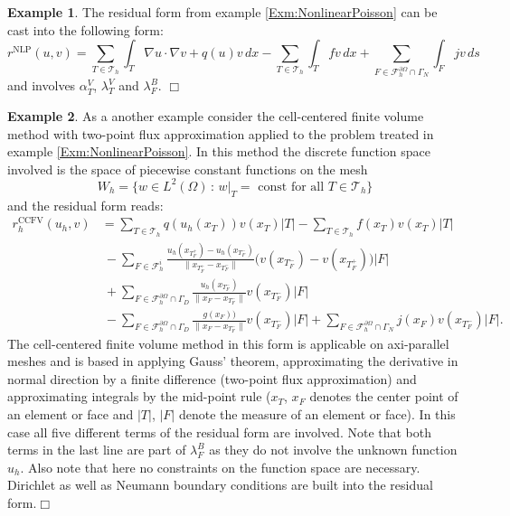 \documentclass[a4paper,12pt]{article}
\theoremstyle{definition}
\newtheorem{exm}{Example}
\begin{document}
\begin{exm} \label{Exm:NonlinearPoissonDetailedResidualForm}
The residual form from example \ref{Exm:NonlinearPoisson} can be cast into the
following form:
\begin{equation*}
r^{\text{NLP}}(u,v) = 
\sum_{T\in\mathcal{T}_h} \int_T \nabla u \cdot \nabla v + q(u)v \,dx
- \sum_{T\in\mathcal{T}_h} \int_T fv \,dx 
+ \sum_{F\in\mathcal{F}_h^{\partial\Omega}\cap\Gamma_N} \int_{F} jv\,ds
\end{equation*}
and involves $\alpha_T^V$, $\lambda_T^V$ and $\lambda_F^B$. \hfill$\Box$
\end{exm}

\begin{exm} \label{Exm:FiniteVolumeMethod}
As a another example consider the cell-centered finite volume method with two-point
flux approximation applied to the problem treated in example \ref{Exm:NonlinearPoisson}.
In this method the discrete function space involved is the space of piecewise constant
functions on the mesh
\begin{equation*}
W_h = \{w\in L^2(\Omega) \,:\,  \text{$w|_T=$ const for all $T\in\mathcal{T}_h$}\}
\end{equation*}
and the residual form reads:
\begin{equation*}
\begin{split}
r_h^{\text{CCFV}}(u_h,v) 
& = \sum_{T\in\mathcal{T}_h} q(u_h(x_T)) v(x_T) |T|
- \sum_{T\in\mathcal{T}_h} f(x_T) v(x_T) |T|\\
&\ - \sum_{F\in\mathcal{F}_h^i} 
\frac{u_h(x_{T_F^+})-u_h(x_{T_F^-})}{\|x_{T_F^+} - x_{T_F^-}\|}
\bigl(v(x_{T_F^-}) - v(x_{T_F^+})\bigr) |F|\\
&\ + \sum_{F\in\mathcal{F}_h^{\partial\Omega}\cap\Gamma_D} 
\frac{u_h(x_{T_F^-})}{\|x_{F} - x_{T_F^-}\|} v(x_{T_F^-}) |F| \\
&\ - \sum_{F\in\mathcal{F}_h^{\partial\Omega}\cap\Gamma_D} 
\frac{g(x_{F}))}{\|x_{F} - x_{T_F^-}\|} v(x_{T_F^-}) |F|
+ \sum_{F\in\mathcal{F}_h^{\partial\Omega}\cap\Gamma_N} j(x_{F}) v(x_{T_F^-}) |F| .
\end{split}
\end{equation*}
The cell-centered finite volume method in this form is applicable on
axi-parallel meshes and is based in applying Gauss' theorem, approximating
the derivative in normal direction by a finite difference (two-point
flux approximation) and approximating integrals by the mid-point rule
($x_T$, $x_F$ denotes the center point of an element or face and 
$|T|$, $|F|$ denote the measure of an element or face).
In this case all five different terms of the residual form are involved.
Note that both terms in the last line are part of $\lambda_F^B$ as
they do not involve the unknown function $u_h$. 
Also note that here no constraints on the function space are necessary.
Dirichlet as well as Neumann boundary conditions are built into the
residual form.\hfill$\Box$
\end{exm}
\end{document}
